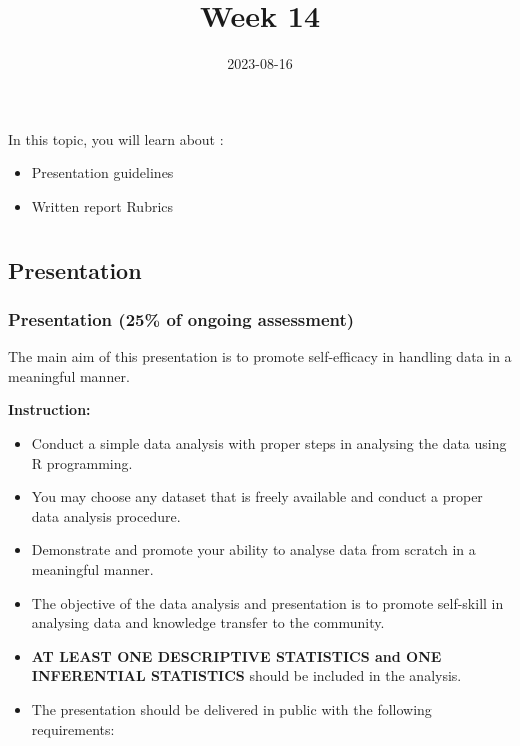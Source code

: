 \documentclass[
]{article}
\title{Week 14}
\author{}
\date{\vspace{-2.5em}2023-08-16}
\providecommand{\tightlist}{%
  \setlength{\itemsep}{0pt}\setlength{\parskip}{0pt}}
\begin{document}
\maketitle

In this topic, you will learn about :

\begin{itemize}
\tightlist
\item
  Presentation guidelines
\item
  Written report Rubrics
\end{itemize}

\hypertarget{section}{%
\section{}\label{section}}

\hypertarget{presentation}{%
\subsection{Presentation}\label{presentation}}

\hypertarget{presentation-25-of-ongoing-assessment}{%
\subsubsection{Presentation (25\% of ongoing
assessment)}\label{presentation-25-of-ongoing-assessment}}

The main aim of this presentation is to promote self-efficacy in
handling data in a meaningful manner.

\textbf{Instruction:}

\begin{itemize}
\tightlist
\item
  Conduct a simple data analysis with proper steps in analysing the data
  using R programming.
\item
  You may choose any dataset that is freely available and conduct a
  proper data analysis procedure.
\item
  Demonstrate and promote your ability to analyse data from scratch in a
  meaningful manner.
\item
  The objective of the data analysis and presentation is to promote
  self-skill in analysing data and knowledge transfer to the community.
\item
  \textbf{AT LEAST ONE DESCRIPTIVE STATISTICS and ONE INFERENTIAL
  STATISTICS} should be included in the analysis.
\item
  The presentation should be delivered in public with the following
  requirements:
\end{itemize}
\end{document}
